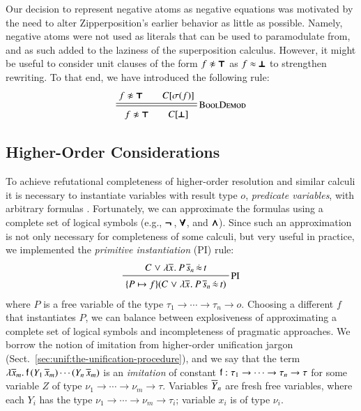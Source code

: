 Our decision to represent negative atoms as negative equations was motivated by
the need to alter Zipperposition's earlier behavior as little as possible. 
Namely, negative atoms were not used as literals that can be used
to paramodulate from, and as such added to the laziness of the superposition calculus.
However, it might be useful to consider unit clauses of the form $f \noteq \itrue$
as $f \approx \pmb{\bot}$ to strengthen rewriting. To that end, we have introduced the following
rule:
%
$$ \namedsimp{BoolDemod}{f \noteq \itrue \qquad C[\sigmaterm{f}]}{f \noteq \itrue \qquad C[\ifalse]} $$

\subsection{Higher-Order Considerations}
\label{subsect:bool:core}
To achieve refutational completeness of higher-order resolution and similar
calculi it is necessary to instantiate variables with result type $o$,
\emph{predicate variables}, with arbitrary formulas
\cite{as-18-phd,pa-01-classical-ty-thy}. Fortunately, we can approximate the
formulas using a complete set of logical symbols (e.g., $\pmb{\neg\,}$, $\pmb{\forall}$, and
$\pmb{\land}$). Since such an approximation is not only necessary for completeness of
some calculi, but very useful in practice, we implemented the \emph{primitive
instantiation} (PI) rule:
%
$$ \namedinference{PI} {C \llor \lam{\tuple{x}{}}{P \, \tuplen{s}} \, \dot{\eq}
\, t} {\substcl{\{ P
\mapsto f \}}{C \llor \lam{\tuple{x}{}}{P \, \tuplen{s}} \, \dot{\eq} \, t}  } $$
%
where $P$ is a free variable of
the type $\tau_1 \rightarrow \cdots \rightarrow \tau_n \rightarrow o$. 
Choosing a different $f$ that instantiates $P$, we can balance between
explosiveness of approximating a complete set of logical symbols and
incompleteness of pragmatic approaches. We borrow the notion of imitation from
higher-order unification jargon (Sect.~\ref{sec:unif:the-unification-procedure}), and we say
that the term $\lambda \overline{x}_{m}.\> \mathsf{f} \, (Y_1 \, \overline{x}_{m}) \cdots (Y_n
\, \overline{x}_{m}) $ is an \emph{imitation} of constant $\mathsf{f} : \tau_1
\rightarrow \cdots \rightarrow \tau_n \rightarrow \tau$ for some variable $Z$ of type $\nu_1
\rightarrow \cdots \rightarrow \nu_m \rightarrow \tau$. Variables $\overline{Y}_{n}$
are fresh free variables, where each $Y_i$ has the type $\nu_1 \rightarrow
\cdots \rightarrow \nu_m \rightarrow \tau_i$; variable $x_i$ is of type $\nu_i$.
\pagebreak[2]

